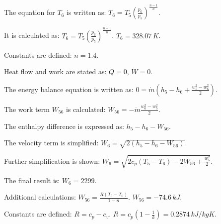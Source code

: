 The equation for \( T_6 \) is written as:  
\( T_6 = T_5 \left( \frac{p_6}{p_5} \right)^{\frac{n-1}{n}} \).  

It is calculated as:  
\( T_6 = T_5 \left( \frac{p_6}{p_5} \right)^{\frac{n-1}{n}} \).  
\( T_6 = 328.07 \, K \).  

Constants are defined:  
\( n = 1.4 \).  

Heat flow and work are stated as:  
\( \dot{Q} = 0 \), \( \dot{W} = 0 \).  

The energy balance equation is written as:  
\( 0 = \dot{m} \left( h_5 - h_6 + \frac{w_5^2 - w_6^2}{2} \right) \).  

The work term \( W_{56} \) is calculated:  
\( W_{56} = - \dot{m} \frac{w_6^2 - w_5^2}{2} \).  

The enthalpy difference is expressed as:  
\( h_5 - h_6 - W_{56} \).  

The velocity term is simplified:  
\( W_6 = \sqrt{2 \left( h_5 - h_6 - W_{56} \right)} \).  

Further simplification is shown:  
\( W_6 = \sqrt{2 c_p \left( T_5 - T_6 \right) - 2 W_{56} + \frac{w_5^2}{2}} \).  

The final result is:  
\( W_6 = 2299 \).  

Additional calculations:  
\( W_{56} = \frac{R \left( T_5 - T_6 \right)}{1 - n} \).  
\( W_{56} = -74.6 \, kJ \).  

Constants are defined:  
\( R = c_p - c_v \).  
\( R = c_p \left( 1 - \frac{1}{k} \right) = 0.2874 \, kJ/kgK \).